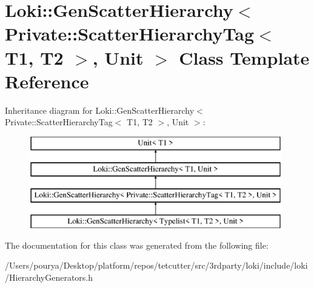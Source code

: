 \hypertarget{classLoki_1_1GenScatterHierarchy_3_01Private_1_1ScatterHierarchyTag_3_01T1_00_01T2_01_4_00_01Unit_01_4}{}\section{Loki\+:\+:Gen\+Scatter\+Hierarchy$<$ Private\+:\+:Scatter\+Hierarchy\+Tag$<$ T1, T2 $>$, Unit $>$ Class Template Reference}
\label{classLoki_1_1GenScatterHierarchy_3_01Private_1_1ScatterHierarchyTag_3_01T1_00_01T2_01_4_00_01Unit_01_4}
Inheritance diagram for Loki\+:\+:Gen\+Scatter\+Hierarchy$<$ Private\+:\+:Scatter\+Hierarchy\+Tag$<$ T1, T2 $>$, Unit $>$\+:\begin{figure}[H]
\begin{center}
\leavevmode
\includegraphics[height=4.000000cm]{classLoki_1_1GenScatterHierarchy_3_01Private_1_1ScatterHierarchyTag_3_01T1_00_01T2_01_4_00_01Unit_01_4}
\end{center}
\end{figure}


The documentation for this class was generated from the following file\+:\begin{DoxyCompactItemize}
\item 
/\+Users/pourya/\+Desktop/platform/repos/tetcutter/src/3rdparty/loki/include/loki/Hierarchy\+Generators.\+h\end{DoxyCompactItemize}
